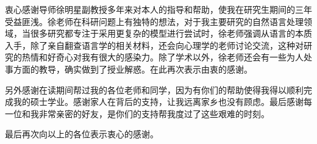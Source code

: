 \begin{acknowledgement}

衷心感谢导师徐明星副教授多年来对本人的指导和帮助，使我在研究生期间的三年受益匪浅。徐老师在科研问题上有独特的想法，对于我主要研究的自然语言处理领域，当很多研究都专注于采用更复杂的模型进行尝试时，徐老师强调从语言的本质入手，除了亲自翻查语言学的相关材料，还会向心理学的老师讨论交流，这种对研究的热情和好奇心对我有很大的感染力。除了学术以外，徐老师还会有一些为人处事方面的教导，确实做到了授业解惑。在此再次表示由衷的感谢。

另外感谢在读期间帮过我的各位老师和同学，因为有你们的帮助使得我得以顺利完成我的硕士学业。感谢家人在背后的支持，让我远离家乡也没有顾虑。最后感谢每一位和我非常亲密的好友，是你们的支持帮我度过了这些艰难的时刻。

最后再次向以上的各位表示衷心的感谢。


\end{acknowledgement}
